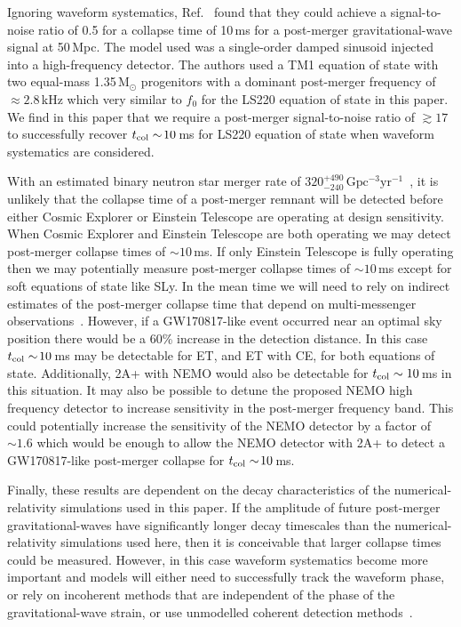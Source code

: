 \documentclass[../Thesis.tex]{subfiles}
\begin{document}
    Ignoring waveform systematics, Ref.~\cite{Zhang2021} found that they could achieve a signal-to-noise ratio of 0.5 for a collapse time of 10\,ms for a post-merger gravitational-wave signal at 50\,Mpc.
    The model used was a single-order damped sinusoid injected into a high-frequency detector.
    The authors used a TM1 equation of state with two equal-mass 1.35\,M$_\odot$ progenitors with a dominant post-merger frequency of $\approx 2.8$\,kHz which very similar to $f_0$ for the LS220 equation of state in this paper.
    We find in this paper that we require a post-merger signal-to-noise ratio of $\gtrsim 17$ to successfully recover $t_{\mathrm{col}}\sim\!10$\,ms for LS220 equation of state when waveform systematics are considered.
    
    With an estimated binary neutron star merger rate of $320^{+490}_{-240}\,\mathrm{Gpc^{-3}yr^{-1}}$~\cite{PopGWTC2}, it is unlikely that the collapse time of a post-merger remnant will be detected before either Cosmic Explorer or Einstein Telescope are operating at design sensitivity.
    When Cosmic Explorer and Einstein Telescope are both operating we may detect post-merger collapse times of $\sim\!10$\,ms.
    If only Einstein Telescope is fully operating then we may potentially measure post-merger collapse times of $\sim\!10$\,ms except for soft equations of state like SLy.
    In the mean time we will need to rely on indirect estimates of the post-merger collapse time that depend on multi-messenger observations~\cite[e.g.,][]{Metzger2018,Gill2019,Murguia-Berthier2021,Yu2018}.
    However, if a GW170817-like event occurred near an optimal sky position there would be a 60\% increase in the detection distance.
    In this case $t_{\mathrm{col}} \sim\!10$\,ms may be detectable for ET, and ET with CE, for both equations of state.
    Additionally, 2A+ with NEMO would also be detectable for $t_{\mathrm{col}} \sim 10$\,ms in this situation.
    It may also be possible to detune the proposed NEMO high frequency detector to increase sensitivity in the post-merger frequency band.
    This could potentially increase the sensitivity of the NEMO detector by a factor of $\sim\!1.6$ which would be enough to allow the NEMO detector with 2A+ to detect a GW170817-like post-merger collapse for $t_{\mathrm{col}} \sim\! 10$\,ms. \par
    Finally, these results are dependent on the decay characteristics of the numerical-relativity simulations used in this paper.
    If the amplitude of future post-merger gravitational-waves have significantly longer decay timescales than the numerical-relativity simulations used here, then it is conceivable that larger collapse times could be measured.
    However, in this case waveform systematics become more important and models will either need to successfully track the waveform phase, or rely on incoherent methods that are independent of the phase of the gravitational-wave strain, or use unmodelled coherent detection methods~\cite[e.g.,][]{GW170817Postmerger1,GW170817Postmerger2}.
     
\end{document}
